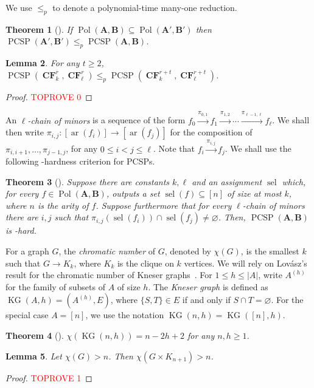 \documentclass[a4paper,11pt]{article}
\renewcommand\emptyset\varnothing
\newcommand{\2}{\vec{2}}
\newcommand{\1}{\vec{1}}
\newcommand{\0}{\vec{0}}
\renewcommand{\A}{\ensuremath{\mathbf{A}}}
\newcommand{\B}{\ensuremath{\mathbf{B}}}
\newcommand{\KK}{\ensuremath{K}}
\DeclareMathOperator{\sel}{sel}
\DeclareMathOperator{\ar}{ar}
\DeclareMathOperator{\KG}{KG}
\DeclareMathOperator{\PCSP}{PCSP}
\DeclareMathOperator{\Pol}{Pol}
\DeclareMathOperator{\CF}{\mathbf{CF}}
\theoremstyle{plain}
\newtheorem{theorem}{Theorem}
\newtheorem{lemma}[theorem]{Lemma}
\theoremstyle{definition}
\begin{document}
We use $\leq_p$ to denote a polynomial-time many-one reduction.

\begin{theorem}[\cite{BG21:sicomp}]\label{polsubset}
If $\Pol(\A,\B) \subseteq \Pol(\A',\B')$ then $\PCSP(\A',\B')\leq_p\PCSP(\A,\B)$.
\end{theorem}
\begin{lemma}\label{lem:red}
    For any $t\geq 2$, $\PCSP(\CF_k^r, \CF_\ell^r)
    \leq_p \PCSP(\CF_k^{r + t}, \CF_\ell^{r + t})$.
\end{lemma}
\begin{proof}\textcolor{red}{TOPROVE 0}\end{proof}

An \emph{$\ell$-chain of minors} is a sequence of the form $f_0 \xrightarrow{\pi_{0,1}} f_1 \xrightarrow{\pi_{1,2}} \cdots \xrightarrow{\pi_{\ell-1,\ell}} f_\ell$. We shall then write $\pi_{i,j}: [\ar(f_i)]\to[\ar(f_j)]$ for the composition of $\pi_{i,i+1}, \dots, \pi_{j-1,j}$, for any $0\leq i < j\leq \ell$. Note that $f_i \xrightarrow{\pi_{i,j}} f_j$. 
We shall use the following \NP-hardness criterion for PCSPs. 
\begin{theorem}[\cite{BWZ21}]\label{thm:chain hardness}
    Suppose there are constants $k, \ell$ and an assignment
    $\sel$ which, for every $f \in \Pol(\A, \B)$, outputs a set $\sel(f) \subseteq [n]$ of size at most $k$, where $n$ is the arity of $f$.
    Suppose furthermore that for every $\ell$-chain of minors there are
    $i, j$ such that $\pi_{i, j}(\sel(f_i))
    \cap \sel(f_j) \neq \varnothing$. Then, 
    $\PCSP(\A,\B)$ is \NP-hard.
\end{theorem}

For a graph $G$, the \emph{chromatic number} of $G$, denoted by $\chi(G)$, is the smallest $k$ such
that $G\to \KK_k$, where $\KK_k$ is the clique on $k$
vertices.
We will rely on Lov\'asz's result for the chromatic number of Kneser graphs~\cite{Lovasz78}.
For $1\leq h \leq |A|$, write $A^{(h)}$ for the family of subsets of $A$ of size $h$.
The \emph{Kneser graph} is defined as 
$\KG(A,h) = (A^{(h)},E)$,
where $\{S,T\} \in E$ if and only if $S\cap T = \emptyset$. For the special case $A = [n]$, we use the notation $\KG(n, h) = \KG([n], h)$.

\begin{theorem}[\cite{Lovasz78}]\label{kneserchrombound}
  $\chi(\KG(n,h))=n-2h+2$ for any $n,h\geq 1$.
\end{theorem}
\begin{lemma}\label{prodchrombound}
	Let $\chi(G) > n$. Then $\chi(G \times \KK_{n+1}) > n$.
\end{lemma}
\begin{proof}\textcolor{red}{TOPROVE 1}\end{proof}
\end{document}

